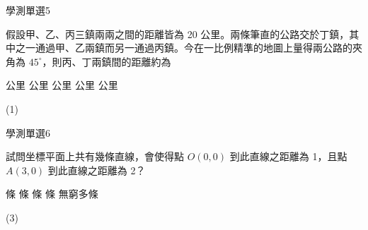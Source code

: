     \begin{QUESTION}
        \begin{ExamInfo}{98}{學測}{單選}{5}
        \end{ExamInfo}
        \begin{ExamAnsRateInfo}{50}{86}{47}{17}
        \end{ExamAnsRateInfo}
        \begin{QBODY}
            假設甲、乙、丙三鎮兩兩之間的距離皆為 20 公里。兩條筆直的公路交於丁鎮，其中之一通過甲、乙兩鎮而另一通過丙鎮。今在一比例精準的地圖上量得兩公路的夾角為 $45^\circ$，則丙、丁兩鎮間的距離約為 
			\begin{QOPS}
				 公里 
				 公里 
				 公里 
				 公里 
				 公里 
			\end{QOPS}
        \end{QBODY}
        \begin{QFROMS}
        \end{QFROMS}
        \begin{QTAGS}\end{QTAGS}
        \begin{QANS}
            (1)
        \end{QANS}
        \begin{QSOLLIST}
        \end{QSOLLIST}
        \begin{QEMPTYSPACE}
        \end{QEMPTYSPACE}
    \end{QUESTION}
    \begin{QUESTION}
        \begin{ExamInfo}{98}{學測}{單選}{6}
        \end{ExamInfo}
        \begin{ExamAnsRateInfo}{33}{58}{27}{14}
        \end{ExamAnsRateInfo}
        \begin{QBODY}
            試問坐標平面上共有幾條直線，會使得點 $O(0,0)$ 到此直線之距離為 1，且點 $A(3,0)$ 到此直線之距離為 2？
			\begin{QOPS} 
				\QOP 1 條        
				\QOP 2 條 
				\QOP 3 條 
				\QOP 4 條 
				\QOP 無窮多條
			\end{QOPS}
        \end{QBODY}
        \begin{QFROMS}
        \end{QFROMS}
        \begin{QTAGS}\end{QTAGS}
        \begin{QANS}
            (3)
        \end{QANS}
        \begin{QSOLLIST}
        \end{QSOLLIST}
        \begin{QEMPTYSPACE}
        \end{QEMPTYSPACE}
    \end{QUESTION}
